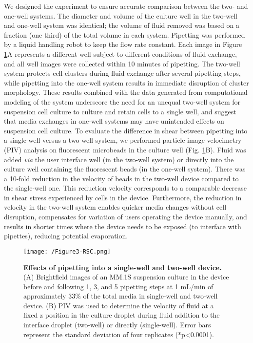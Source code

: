 We designed the experiment to ensure accurate comparison between the two- and one-well systems. The diameter and volume of the culture well in the two-well and one-well system was identical; the volume of fluid removed was based on a fraction (one third) of the total volume in each system. Pipetting was performed by a liquid handling robot to keep the flow rate constant. Each image in Figure \ref{figure:Fig3}A represents a different well subject to different conditions of fluid exchange, and all well images were collected within 10 minutes of pipetting. The two-well system protects cell clusters during fluid exchange after several pipetting steps, while pipetting into the one-well system results in immediate disruption of cluster morphology. These results combined with the data generated from computational modeling of the system underscore the need for an unequal two-well system for suspension cell culture to culture and retain cells to a single well, and suggest that media exchanges in one-well systems may have unintended effects on suspension cell culture.
To evaluate the difference in shear between pipetting into a single-well versus a two-well system, we performed particle image velocimetry (PIV) analysis on fluorescent microbeads in the culture well (Fig. \ref{figure:Fig3}B). Fluid was added \textit{via} the user interface well (in the two-well system) or directly into the culture well containing the fluorescent beads (in the one-well system). There was a 10-fold reduction in the velocity of beads in the two-well device compared to the single-well one. This reduction velocity corresponds to a comparable decrease in shear stress experienced by cells in the device. Furthermore, the reduction in velocity in the two-well system enables quicker media changes without cell disruption, compensates for variation of users operating the device manually, and results in shorter times where the device needs to be exposed (to interface with pipettes), reducing potential evaporation.

\begin{figure}[ht] %
\centering
\texttt{[image: /Figure3-RSC.png]}
\caption{\textbf{Effects of pipetting into a single-well and two-well device.} (A) Brightfield images of an MM.1S suspension culture in the device before and following 1, 3, and 5 pipetting steps at 1 mL/min of approximately 33\% of the total media in single-well and two-well device. (B) PIV was used to determine the velocity of fluid at a fixed z position in the culture droplet during fluid addition to the interface droplet (two-well) or directly (single-well). Error bars represent the standard deviation of four replicates (*p<0.0001).}
\label{figure:Fig3}
\end{figure}

